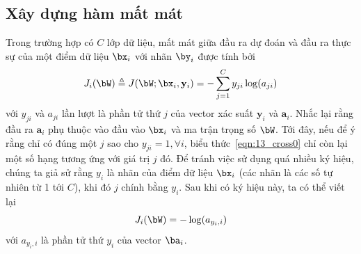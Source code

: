 \subsection{Xây dựng hàm mất mát}
Trong trường hợp có $C$ lớp dữ liệu, {mất mát} giữa
đầu ra dự đoán và đầu ra thực sự của một điểm dữ liệu $\bx_i$ với
nhãn $\by_i$ được tính bởi
\begin{equation}
\label{eqn:13_cross0}
J_i(\bW) \triangleq J(\bW;\bx_i, \mathbf{y}_i) = -\sum_{j=1}^C
y_{ji}\log(a_{ji})
\end{equation}
với $y_{ji}$ và $ a_{ji}$ lần lượt là phần tử thứ $j$ của vector xác suất
$\mathbf{y}_i$ và $\mathbf{a}_i$. Nhắc lại rằng đầu ra $\mathbf{a}_i$ phụ thuộc vào đầu vào $\bx_i$ và ma trận trọng số $\bW$.
Tới đây, nếu để ý rằng chỉ có đúng một $j$ sao cho $y_{ji} = 1, \forall i$, biểu
thức~\eqref{eqn:13_cross0} chỉ còn lại một số hạng tương ứng với giá trị $j$ đó.
Để tránh việc sử dụng quá nhiều ký hiệu, chúng ta giả sử rằng $y_i$ là nhãn
của điểm dữ liệu $\bx_i$ (các nhãn là các số tự nhiên từ 1 tới $C$), khi đó $j$
chính bằng $y_i$. Sau khi có
ký hiệu này, ta có thể viết lại
\begin{equation}
J_i(\bW) = - \log(a_{y_i, i})
\end{equation}
với $a_{y_i, i}$ là phần tử thứ $y_i$ của vector $\ba_i$.

